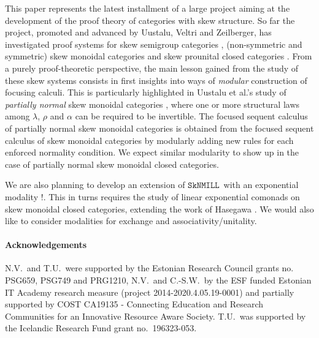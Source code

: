 \documentclass[copyright,creativecommons]{eptcs}
\theoremstyle{definition}
\newcommand{\SkNMILL}{$\mathtt{SkNMILL}$}
\begin{document}
This paper represents the latest installment of a large project aiming at the development of the proof theory of categories with skew structure. So far the project, promoted and advanced by Uustalu, Veltri and Zeilberger, has investigated proof systems for skew semigroup categories \cite{zeilberger:semiassociative:19}, (non-symmetric and symmetric) skew monoidal categories \cite{uustalu:sequent:2021,uustalu:proof:nodate,veltri:coherence:2021} and skew prounital closed categories \cite{uustalu:deductive:nodate}. From a purely proof-theoretic perspective, the main lesson gained from the study of these skew systems consists in first insights into ways of \emph{modular} construction of focusing calculi. This is particularly highlighted in Uustalu et al.'s study of \emph{partially normal} skew monoidal categories \cite{uustalu:proof:nodate}, where one or more structural laws among $\lambda$, $\rho$ and $\alpha$ can be required to be invertible. The focused sequent calculus of partially normal skew monoidal categories is obtained from the focused sequent calculus of skew monoidal categories by modularly adding new rules for each enforced normality condition.
We expect similar modularity to show up in the case of partially normal skew monoidal closed categories.

We are also planning to develop an extension of \SkNMILL\ with an exponential modality $!$. This in turns requires the study of linear exponential comonads on skew monoidal closed categories, extending the work of Hasegawa \cite{hasegawa:linear:2017}. We would also like to consider modalities for exchange \cite{jiang:lambek:2019} and associativity/unitality.

\paragraph{Acknowledgements} N.V.\ and T.U.\ were supported by the
Estonian Research Council grants no. \linebreak PSG659, PSG749 and PRG1210, N.V.\ and
C.-S.W.\ by the ESF funded Estonian IT Academy research measure
(project 2014-2020.4.05.19-0001) and partially supported by  COST CA19135 - Connecting Education and Research Communities for an Innovative Resource Aware Society. T.U.\ was supported by the Icelandic
Research Fund grant no.~196323-053.

  
  
\end{document}
